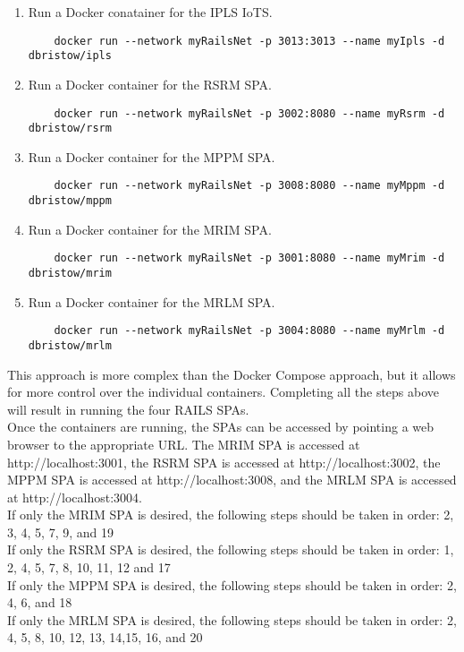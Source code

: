 \begin{enumerate}
\begin{verbatim}
    \end{verbatim}
    \item Run a Docker conatainer for the \ac{IPLS} \ac{IoTS}.
    \begin{verbatim}
    docker run --network myRailsNet -p 3013:3013 --name myIpls -d dbristow/ipls
    \end{verbatim}
    \item Run a Docker container for the \ac{RSRM} \ac{SPA}.
    \begin{verbatim}
    docker run --network myRailsNet -p 3002:8080 --name myRsrm -d dbristow/rsrm
    \end{verbatim}
    \item Run a Docker container for the \ac{MPPM} \ac{SPA}.
    \begin{verbatim}
    docker run --network myRailsNet -p 3008:8080 --name myMppm -d dbristow/mppm
    \end{verbatim}
    \item Run a Docker container for the \ac{MRIM} \ac{SPA}.
    \begin{verbatim}
    docker run --network myRailsNet -p 3001:8080 --name myMrim -d dbristow/mrim
    \end{verbatim}
    \item Run a Docker container for the \ac{MRLM} \ac{SPA}.
    \begin{verbatim}
    docker run --network myRailsNet -p 3004:8080 --name myMrlm -d dbristow/mrlm
    \end{verbatim}
\end{enumerate}
This approach is more complex than the Docker Compose approach, but it allows for more control over the individual containers. Completing all the steps above will result in running the four \ac{RAILS} \acp{SPA}.\vspace{5mm}\\
Once the containers are running, the \acp{SPA} can be accessed by pointing a web browser to the appropriate URL. The \ac{MRIM} \ac{SPA} is accessed at http://localhost:3001, the \ac{RSRM} \ac{SPA} is accessed at http://localhost:3002, the \ac{MPPM} \ac{SPA} is accessed at http://localhost:3008, and the \ac{MRLM} \ac{SPA} is accessed at http://localhost:3004.\vspace{5mm}\\  
If only the \ac{MRIM} \ac{SPA} is desired, the following steps should be taken in order: 2, 3, 4, 5, 7, 9, and 19\\
If only the \ac{RSRM} \ac{SPA} is desired, the following steps should be taken in order: 1, 2, 4, 5, 7, 8, 10, 11, 12 and 17\\
If only the \ac{MPPM} \ac{SPA} is desired, the following steps should be taken in order: 2, 4, 6, and 18\\
If only the \ac{MRLM} \ac{SPA} is desired, the following steps should be taken in order: 2, 4, 5, 8, 10, 12, 13, 14,15, 16, and 20\\
